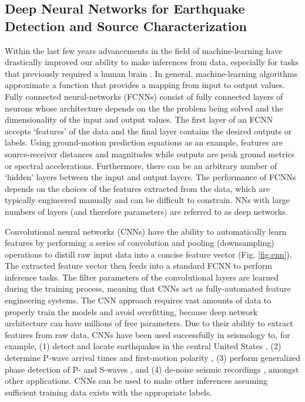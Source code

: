 \documentclass[12p]{article}
\begin{document}
\subsection*{Deep Neural Networks for Earthquake Detection and Source Characterization}

Within the last few years advancements in the field of machine-learning have drastically improved our ability to make inferences from data, especially for tasks that previously required a human brain \citep{Lecun2015}. In general, machine-learning algorithms approximate a function that provides a mapping from input to output values. Fully connected neural-networks (FCNNs) consist of fully connected layers of neurons whose architecture depends on the the problem being solved and the dimensionality of the input and output values. The first layer of an FCNN accepts `features' of the data and the final layer contains the desired outputs or labels. Using ground-motion prediction equations as an example, features are source-receiver distances and magnitudes while outputs are peak ground metrics or spectral accelerations. Furthermore, there can be an arbitrary number of `hidden' layers between the input and output layers. The performance of FCNNs depends on the choices of the features extracted from the data, which are typically engineered manually and can be difficult to constrain. NNs with large numbers of layers (and therefore parameters) are referred to as deep networks.

Convolutional neural networks (CNNs) have the ability to automatically learn features by performing a series of convolution and pooling (downsampling) operations to distill raw input data into a concise feature vector (Fig. \ref{fig:cnn}). The extracted feature vector then feeds into a standard FCNN to perform inference tasks. The filter parameters of the convolutional layers are learned during the training process, meaning that CNNs act as fully-automated feature engineering systems. The CNN approach requires vast amounts of data to properly train the models and avoid overfitting, because deep network architecture can have millions of free parameters. Due to their ability to extract features from raw data, CNNs have been used successfully in seismology to, for example, (1) detect and locate earthquakes in the central United States \citep{Perol2018}, (2) determine P-wave arrival times and first-motion polarity \citep{Ross2018a}, (3) perform generalized phase detection of P- and S-waves \citep{Ross2018b, Zhu2019a}, and (4) de-noise seismic recordings \cite{Zhu2019b}, amongst other applications. CNNs can be used to make other inferences assuming sufficient training data exists with the appropriate labels.
\end{document}
